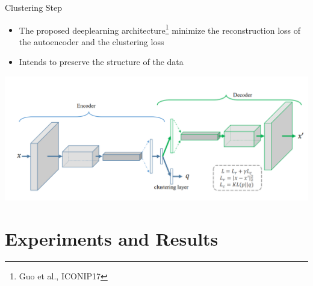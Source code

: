 \documentclass[usenames,dvipsnames]{beamer}
\let\oldfootnote\footnote
\renewcommand\footnote[1][]{\footnotesize\oldfootnote[frame,#1]}
\renewcommand{\footnotesize}{\tiny}
\begin{document}
\begin{frame}{Clustering Step}
\begin{itemize}
 \item The proposed deeplearning architecture\footnote{Guo et al., ICONIP17 } \normalsize minimize the reconstruction loss of the autoencoder and the clustering loss
 \item Intends to preserve the structure of the data
\end{itemize}
\includegraphics[width = \textwidth]{imagenes/ClusterinLayer.png}

\end{frame}






 



\section{Experiments and Results}
\end{document}

